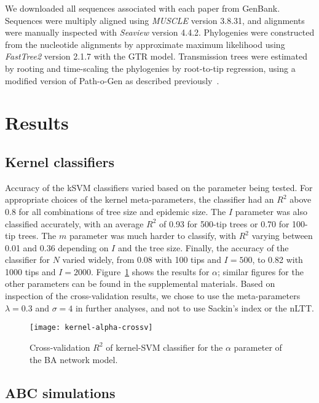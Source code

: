 \documentclass[12pt]{article}\usepackage[]{graphicx}\usepackage[]{color}
\newcommand{\software}[1]{\textit{#1}}
\begin{document}
We downloaded all sequences associated with each paper from GenBank. Sequences
were multiply aligned using \software{MUSCLE} version 3.8.31, and alignments
were manually inspected with \software{Seaview} version 4.4.2. Phylogenies were
constructed from the nucleotide alignments by approximate maximum likelihood
using \software{FastTree2} version 2.1.7 with the GTR model. Transmission trees
were estimated by rooting and time-scaling the phylogenies by root-to-tip
regression, using a modified version of Path-o-Gen as described
previously~\autocite{poon2015phylodynamic}.

\section*{Results}

\subsection*{Kernel classifiers}

Accuracy of the \gls{kSVM} classifiers varied based on the parameter being
tested. For appropriate choices of the kernel meta-parameters, the classifier
had an $R^2$ above 0.8 for all combinations of tree size and epidemic size. The
$I$ parameter was also classified accurately, with an average $R^2$ of 0.93 for
500-tip trees or 0.70 for 100-tip trees. The $m$ parameter was much harder to
classify, with $R^2$ varying between 0.01 and 0.36 depending on $I$ and the
tree size. Finally, the accuracy of the classifier for $N$ varied widely, from
0.08 with 100 tips and $I = 500$, to 0.82 with 1000 tips and $I = 2000$.
Figure~\ref{fig:crossv} shows the results for $\alpha$; similar figures for the
other parameters can be found in the supplemental materials. Based on
inspection of the cross-validation results, we chose to use the meta-parameters
$\lambda = 0.3$ and $\sigma = 4$ in further analyses, and not to use Sackin's
index or the \gls{nLTT}.

\begin{figure}
  \texttt{[image: kernel-alpha-crossv]}
  \caption{Cross-validation $R^2$ of kernel-SVM classifier for the $\alpha$
    parameter of the \gls{BA} network model.}
  \label{fig:crossv}
\end{figure}

\subsection*{ABC simulations}
\end{document}
